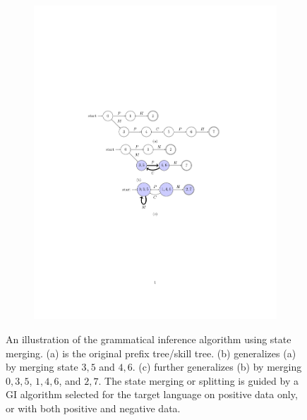 \documentclass[letterpaper, 11 pt, onecolumn]{article}
\begin{document}
\begin{figure}[t!]
\begin{subfigure}[b]{0.28\textwidth}
\includegraphics[width=\textwidth]{fig/merge2.pdf}     
\caption{}\end{subfigure}
    \caption{An illustration of the grammatical inference algorithm using state merging. (a) is the original prefix tree/skill tree. (b) generalizes (a) by merging state $3,5$ and $4,6$. (c) further generalizes (b) by merging $0,3,5$, $1,4,6$, and $2,7$. The state merging or splitting is guided by a GI algorithm selected for the target language on positive data only, or with both positive and negative data.}
    \label{fig:gi}
\end{figure}
\end{document}
